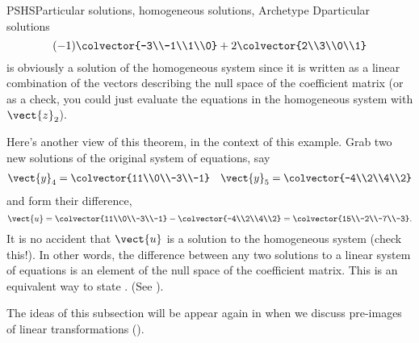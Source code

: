\begin{example}{PSHS}{Particular solutions, homogeneous solutions, Archetype D}{particular solutions}
\begin{equation*}
(-1)\colvector{-3\\-1\\1\\0}+2\colvector{2\\3\\0\\1}
\end{equation*}
%
is obviously a solution of the homogeneous system since it is written as a linear combination of the vectors describing the null space of the coefficient matrix (or as a check, you could just evaluate the equations in the homogeneous system with $\vect{z}_2$).\par
%
Here's another view of this theorem, in the context of this example.  Grab two new solutions of the original system of equations, say
%
\begin{align*}
\vect{y}_4=\colvector{11\\0\\-3\\-1}&&
\vect{y}_5=\colvector{-4\\2\\4\\2}
\end{align*}
%
and form their difference,
%
\begin{equation*}
\vect{u}=\colvector{11\\0\\-3\\-1}-\colvector{-4\\2\\4\\2}=\colvector{15\\-2\\-7\\-3}.
\end{equation*}
%
It is no accident that $\vect{u}$ is a solution to the homogeneous system (check this!).  In other words, the difference between any two solutions to a linear system of equations is an element of the null space of the coefficient matrix.  This is an equivalent way to state .   (See ).
\end{example}
%
The ideas of this subsection will be appear again in  when we discuss pre-images of linear transformations ().
%

